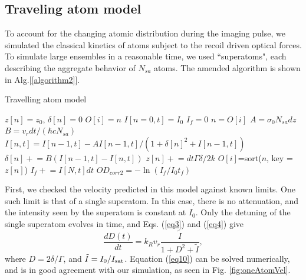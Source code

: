 \documentclass[12pt]{iopart}
\begin{document}
\subsection{Traveling atom model}
To account for the changing atomic distribution during the imaging pulse, we simulated the classical kinetics of atoms subject to the recoil driven optical forces. To simulate large ensembles in a reasonable time, we used ``superatoms",  each describing the aggregate behavior of $N_{sa}$ atoms. The amended algorithm is shown in Alg.[\ref{algorithm2}]. 
\begin{algorithm}
\caption{Travelling atom model}
\label{algorithm2}
\begin{algorithmic}
\STATE $z[n]=z_0$, $\delta[n]=0$ 
\STATE $O[i]=n$ 
\STATE $I[n=0,t]=I_0$  
\STATE $I_f=0$
\STATE $n=O[i]$ 
 \STATE $A=\sigma_0 N_{sa} dz$ 
 \STATE $B=v_r dt/(\hbar c  N_{sa})$  
\STATE $I[n,t]=I[n-1,t] - A I[n-1,t]/(1+\delta[n]^2+I[n-1,t])$  
\STATE $\delta[n]\mathrel{+}=B\left(I[n-1,t]-I[n,t]\right)$   
\STATE $z[n]\mathrel{+}=dt\Gamma\delta/2k$ 
\ENDFOR 
\STATE $O[i]$=sort($n$, key =$z[n]$) 
\STATE $I_f  \mathrel{+}= I[N,t]dt$
\ENDFOR
\STATE $OD_{corr2}=-\ln{(I_f/I_0t_f)}$
\end{algorithmic}
\end{algorithm}
\par First, we checked the velocity predicted in this model against known limits. One such limit is that of a single superatom. In this case, there is no attenuation, and the intensity seen by the superatom is constant at $I_0$. Only the detuning of the single superatom evolves in time, and Eqs. (\ref{eq3}) and (\ref{eq4}) give
\begin{equation}
\frac{dD(t)}{dt}= k_R v_r \frac{\tilde{I}}{1+D^2+\tilde{I}},
\label{eq10}
\end{equation}
where $D = 2\delta/\Gamma$, and $\tilde{I} = I_0/I_{\rm{sat}}$. Equation (\ref{eq10}) can be solved numerically, and is in good agreement with our simulation, as seen in Fig. \ref{fig:oneAtomVel}.
\end{document}
